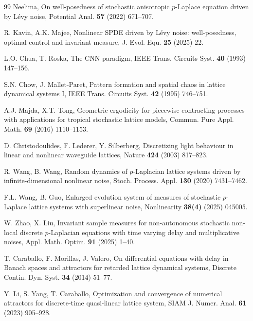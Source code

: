 \documentclass[11pt]{article}
\numberwithin{equation}{section}
\theoremstyle{plain}
\begin{document}
\begin{thebibliography}{99}
     Neelima,
     On well-posedness of stochastic anisotropic $p$-Laplace equation driven by L\'{e}vy noise,
     Potential Anal. \textbf{57} (2022) 671--707. 
     
     R. Kavin, A.K. Majee, 
     Nonlinear SPDE driven by L\'{e}vy noise: well-posedness, optimal control and invariant measure,
     J. Evol. Equ. \textbf{25} (2025) 22.	
     
     L.O. Chua, T. Roska,
     The CNN paradigm,
     IEEE Trans. Circuits Syst. \textbf{40} (1993) 147--156.
     
     S.N. Chow, J. Mallet-Paret, 
     Pattern formation and spatial chaos in lattice dynamical systems I,
     IEEE Trans. Circuits Syst. \textbf{42} (1995) 746--751.

	A.J. Majda, X.T. Tong,
	Geometric ergodicity for piecewise contracting processes with applications for tropical stochastic lattice models,
	Commun. Pure Appl. Math. \textbf{69} (2016) 1110--1153.

     D. Christodoulides, F. Lederer, Y. Silberberg, 
     Discretizing light behaviour in linear and nonlinear waveguide lattices, 
     Nature \textbf{424} (2003) 817--823.
         
         

	R. Wang, B. Wang,
	Random dynamics of $p$-Laplacian lattice systems driven by infinite-dimensional nonlinear noise,
	Stoch. Process. Appl. \textbf{130} (2020) 7431--7462.
			
	F.L. Wang, B. Guo,
	Enlarged evolution system of measures of stochastic $p$-Laplace lattice systems with superlinear noise, 
	Nonlinearity \textbf{38(4)} (2025) 045005.		
	
	W. Zhao, X. Liu,
	Invariant sample measures for non-autonomous stochastic non-local discrete $p$-Laplacian equations with time varying delay and multiplicative noises,
	Appl. Math. Optim. \textbf{91} (2025) 1--40.	


	T. Caraballo, F. Morillas, J. Valero,
	On differential equations with delay in Banach spaces and attractors for retarded lattice dynamical systems,
	Discrete Contin. Dyn. Syst. \textbf{34} (2014) 51--77.

	Y. Li, S. Yang, T. Caraballo, 
	Optimization and convergence of numerical attractors for discrete-time quasi-linear
	lattice system, 
	SIAM J. Numer. Anal. \textbf{61} (2023) 905--928.
	

\end{thebibliography}
\end{document}
